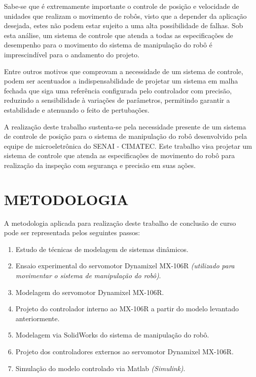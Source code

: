 \documentclass[12pt,oneside,a4paper, chapter=TITLE, section = TITLE, english, brazil]{abntex2}
\begin{document}
Sabe-se que é extremamente importante o controle de posição e velocidade de unidades que realizam o movimento de robôs, visto que a depender da aplicação desejada, estes não podem estar sujeito a uma alta possibilidade de falhas. Sob esta análise, um sistema de controle que atenda a todas as especificações de desempenho para o movimento do sistema de manipulação do robô é imprescindível para o andamento do projeto.

Entre outros motivos que comprovam a necessidade de um sistema de controle, podem ser acentuados a indispensabilidade de projetar um sistema em malha fechada que siga uma referência configurada pelo controlador com precisão, reduzindo a sensibilidade à variações de parâmetros, permitindo garantir a estabilidade e atenuando o feito de pertubações.

A realização deste trabalho sustenta-se pela necessidade presente de um sistema de controle de posição para o sistema de manipulação do robô desenvolvido pela equipe de microeletrônica do SENAI - CIMATEC. Este trabalho visa projetar um sistema de controle que atenda as especificações de movimento do robô para realização da inspeção com segurança e precisão em suas ações.

\section{METODOLOGIA} %

A metodologia aplicada para realização deste trabalho de conclusão de curso pode ser representada pelos seguintes passos:

\begin{enumerate}

\item Estudo de técnicas de modelagem de sistemas dinâmicos.

\item Ensaio experimental do servomotor Dynamixel MX-106R \textit{(utilizado para movimentar o sistema de manipulação do robô)}.

\item Modelagem do servomotor Dynamixel MX-106R. 

\item Projeto do controlador interno ao MX-106R a partir do modelo levantado anteriormente.

\item Modelagem via SolidWorks do sistema de manipulação do robô.

\item Projeto dos controladores externos ao servomotor Dynamixel MX-106R.

\item Simulação do modelo controlado via Matlab \textit{(Simulink)}.

\end{enumerate}
\end{document}
